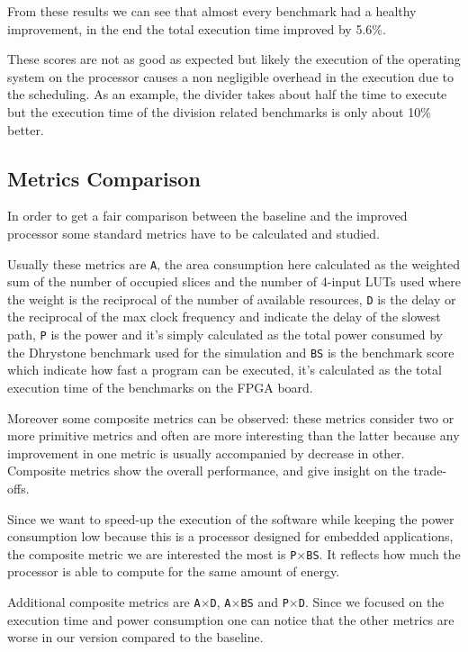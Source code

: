 From these results we can see that almost every benchmark had a healthy improvement, in the end
the total execution time improved by 5.6\%.

These scores are not as good as expected but likely the execution of the operating system
on the processor causes a non negligible overhead in the execution due to the scheduling. As an example, the
divider takes about half the time to execute but the execution time of the division related
benchmarks is only about 10\% better.

\subsection{Metrics Comparison}

In order to get a fair comparison between the baseline and the improved processor some standard
metrics have to be calculated and studied.

Usually these metrics are \texttt{A}, the area consumption here calculated as the weighted sum of the
number of occupied slices and the number of 4-input LUTs used where the weight is the reciprocal
of the number of available resources, \texttt{D} is the delay or the reciprocal of the max clock frequency
and indicate the delay of the slowest path, \texttt{P} is the power and it's simply calculated as the total
power consumed by the Dhrystone benchmark used for the simulation and \texttt{BS} is the benchmark
score which indicate how fast a program can be executed, it's calculated as the total execution
time of the benchmarks on the FPGA board.

Moreover some composite metrics can be observed: these metrics consider two or more primitive
metrics and often are more interesting than the latter because any improvement in one metric is usually accompanied by decrease in other. Composite metrics show the overall performance, and give insight on the trade-offs.

Since we want to speed-up the execution of the software while keeping the power consumption
low because this is a processor designed for embedded applications, the composite metric we are
interested the most is \texttt{P$\times$BS}. It reflects how much the processor is able to compute for the same amount of energy.

Additional composite metrics are \texttt{A$\times$D}, \texttt{A$\times$BS} and \texttt{P$\times$D}. Since we focused on the
execution time and power consumption one can notice that the other metrics are worse in our version
compared to the baseline.

